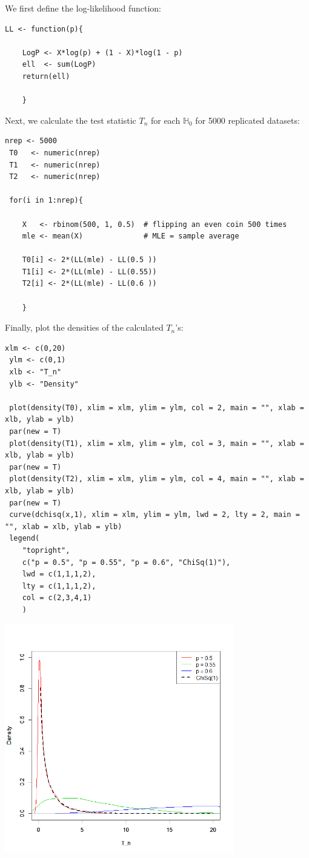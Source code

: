 \documentclass[10.5pt, A4paper, openany, uplatex]{book}
\newcommand{\mbb}{\mathbb}
\numberwithin{equation}{section}
\begin{document}
We first define the log-likelihood function:
\begin{lstlisting}[basicstyle=\ttfamily\footnotesize, frame=single]
 LL <- function(p){ 
 
	LogP <- X*log(p) + (1 - X)*log(1 - p)
	ell  <- sum(LogP)
	return(ell)

	}
\end{lstlisting}
Next, we calculate the test statistic $T_n$ for each $\mbb{H}_0$ for 5000 replicated datasets:
\begin{lstlisting}[basicstyle=\ttfamily\footnotesize, frame=single]
 nrep <- 5000
 T0   <- numeric(nrep)
 T1   <- numeric(nrep)
 T2   <- numeric(nrep)

 for(i in 1:nrep){

	X   <- rbinom(500, 1, 0.5)  # flipping an even coin 500 times
	mle <- mean(X)              # MLE = sample average

	T0[i] <- 2*(LL(mle) - LL(0.5 ))
	T1[i] <- 2*(LL(mle) - LL(0.55))
	T2[i] <- 2*(LL(mle) - LL(0.6 ))

	}
\end{lstlisting}
Finally, plot the densities of the calculated $T_n$'s:
\begin{lstlisting}[basicstyle=\ttfamily\scriptsize, frame=single]
 xlm <- c(0,20)
 ylm <- c(0,1)
 xlb <- "T_n"
 ylb <- "Density"
 
 plot(density(T0), xlim = xlm, ylim = ylm, col = 2, main = "", xlab = xlb, ylab = ylb)
 par(new = T)
 plot(density(T1), xlim = xlm, ylim = ylm, col = 3, main = "", xlab = xlb, ylab = ylb)
 par(new = T)
 plot(density(T2), xlim = xlm, ylim = ylm, col = 4, main = "", xlab = xlb, ylab = ylb)
 par(new = T)
 curve(dchisq(x,1), xlim = xlm, ylim = ylm, lwd = 2, lty = 2, main = "", xlab = xlb, ylab = ylb)
 legend(
	"topright",
	c("p = 0.5", "p = 0.55", "p = 0.6", "ChiSq(1)"), 
	lwd = c(1,1,1,2),
	lty = c(1,1,1,2),
	col = c(2,3,4,1)
	) 
\end{lstlisting}
\begin{center}
	\includegraphics[width=10cm]{LRTsim.png}
\end{center}
\end{document}
